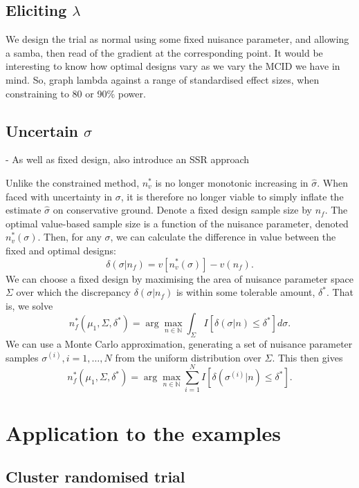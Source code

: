 \documentclass[sagev, Crown]{sagej}
\begin{document}
\subsection{Eliciting $\lambda$}

We design the trial as normal using some fixed nuisance parameter, and allowing a samba, then read of the gradient at the corresponding point. It would be interesting to know how optimal designs vary as we vary the MCID we have in mind. So, graph lambda against a range of standardised effect sizes, when constraining to 80 or 90\% power.

\subsection{Uncertain $\sigma$}

- As well as fixed design, also introduce an SSR approach

Unlike the constrained method, $n^*_v$ is no longer monotonic increasing in $\hat{\sigma}$. When faced with uncertainty in $\sigma$, it is therefore no longer viable to simply inflate the estimate  $\hat{\sigma}$ on conservative ground. Denote a fixed design sample size by $n_f$. The optimal value-based sample size is a function of the nuisance parameter, denoted $n^*_v(\sigma)$. Then, for any $\sigma$, we can calculate the difference in value between the fixed and optimal designs:
$$
\delta(\sigma | n_f) = v[n^*_v(\sigma)] - v(n_f).
$$
We can choose a fixed design by maximising the area of nuisance parameter space $\Sigma$ over which the discrepancy $\delta(\sigma | n_f)$ is within some tolerable amount, $\delta^*$. That is, we solve
$$
n^*_f (\mu_1, \Sigma, \delta^*) = \arg\max_{n \in \mathbb{N}} \int_{\Sigma} I[\delta(\sigma | n) \leq \delta^*] d\sigma.
$$
We can use a Monte Carlo approximation, generating a set of nuisance parameter samples $\sigma^{(i)}, i = 1, \ldots , N$ from the uniform distribution over $\Sigma$. This then gives
\begin{equation}\label{eqn:fix}
n^*_f (\mu_1, \Sigma, \delta^*) = \arg\max_{n \in \mathbb{N}} \sum_{i=1}^N I[\delta(\sigma^{(i)} | n) \leq \delta^*].
\end{equation}

\section{Application to the examples}\label{sec:application}

\subsection{Cluster randomised trial}
\end{document}
